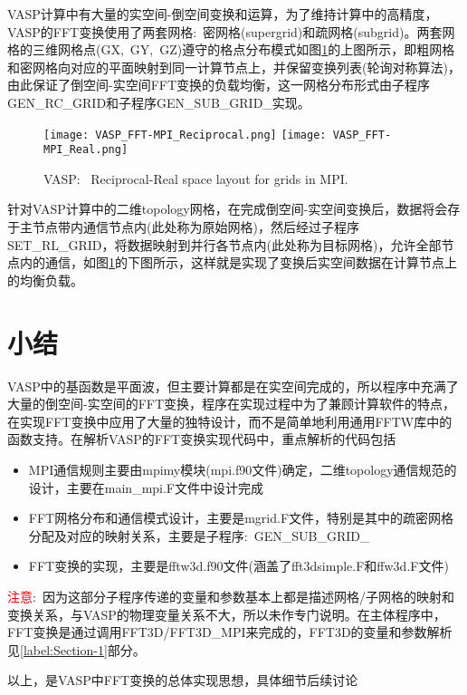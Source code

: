 \textrm{VASP}计算中有大量的实空间-倒空间变换和运算，为了维持计算中的高精度，\textrm{VASP}的\textrm{FFT}变换使用了两套网格:~密网格(\textrm{supergrid})和疏网格(\textrm{subgrid})。两套网格的三维网格点(\textrm{GX},~\textrm{GY},~\textrm{GZ})遵守的格点分布模式如图\ref{Fig:MPI-FFT}的上图所示，即粗网格和密网格向对应的平面映射到同一计算节点上，并保留变换列表(轮询对称算法)，由此保证了倒空间-实空间\textrm{FFT}变换的负载均衡，这一网格分布形式由子程序\textrm{GEN\_RC\_GRID}和子程序\textrm{GEN\_SUB\_GRID\_}实现。
\begin{figure}[h!]
\centering
\texttt{[image: VASP\_FFT-MPI\_Reciprocal.png]}
\vskip 0.5pt
\texttt{[image: VASP\_FFT-MPI\_Real.png]}
\caption{\textrm{VASP:~ Reciprocal-Real space layout for grids in MPI.}}%
\label{Fig:MPI-FFT}
\end{figure} 
针对\textrm{VASP}计算中的二维\textrm{topology}网格，在完成倒空间-实空间变换后，数据将会存于主节点带内通信节点内(此处称为原始网格)，然后经过子程序\textrm{SET\_RL\_GRID}，将数据映射到并行各节点内(此处称为目标网格)，允许全部节点内的通信，如图\ref{Fig:MPI-FFT}的下图所示，这样就是实现了变换后实空间数据在计算节点上的均衡负载。

\section{小结}
\textrm{VASP}中的基函数是平面波，但主要计算都是在实空间完成的，所以程序中充满了大量的倒空间-实空间的\textrm{FFT}变换，程序在实现过程中为了兼顾计算软件的特点，在实现\textrm{FFT}变换中应用了大量的独特设计，而不是简单地利用通用\textrm{FFTW}库中的函数支持。在解析\textrm{VASP}的\textrm{FFT}变换实现代码中，重点解析的代码包括
\begin{itemize}
	\item \textrm{MPI}通信规则主要由\textrm{mpimy}模块(\textrm{mpi.f90}文件)确定，二维\textrm{topology}通信规范的设计，主要在\textrm{main\_mpi.F}文件中设计完成
	\item \textrm{FFT}网格分布和通信模式设计，主要是\textrm{mgrid.F}文件，特别是其中的疏密网格分配及对应的映射关系，主要是子程序:~\textrm{GEN\_SUB\_GRID\_}
	\item \textrm{FFT}变换的实现，主要是\textrm{fftw3d.f90}文件(涵盖了\textrm{fft3dsimple.F}和\textrm{ffw3d.F}文件)
\end{itemize}
\textcolor{red}{注意}:~因为这部分子程序传递的变量和参数基本上都是描述网格/子网格的映射和变换关系，与\textrm{VASP}的物理变量关系不大，所以未作专门说明。在主体程序中，\textrm{FFT}变换是通过调用\textrm{FFT3D/FFT3D\_MPI}来完成的，\textrm{FFT3D}的变量和参数解析见\ref{label:Section-1}部分。

以上，是\textrm{VASP}中\textrm{FFT}变换的总体实现思想，具体细节后续讨论
